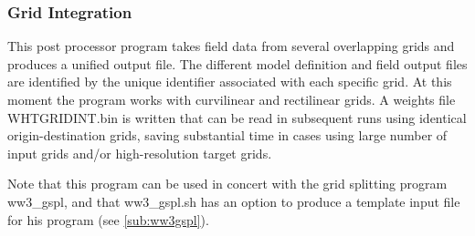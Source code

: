 \vsssub
\subsubsection{Grid Integration} \label{sub:ww3gint}
\vsssub
{}

\vspace{\baselineskip}
\noindent
This post processor program takes field data from several overlapping grids
and produces a unified output file. The different model definition and field
output files are identified by the unique identifier associated with each
specific grid. At this moment the program works with curvilinear and
rectilinear grids. A weights file {\file WHTGRIDINT.bin} is written 
that can be read in subsequent runs using identical origin-destination grids, 
saving substantial time in cases using large number of input grids and/or 
high-resolution target grids.


\vspace{\baselineskip}
\vspace{\baselineskip}
\noindent
Note that this program can be used in concert with the grid splitting program
{\file ww3\_gspl}, and that {\file ww3\_gspl.sh} has an option to produce a
template input file for his program (see \para\ref{sub:ww3gspl}).

\pb
